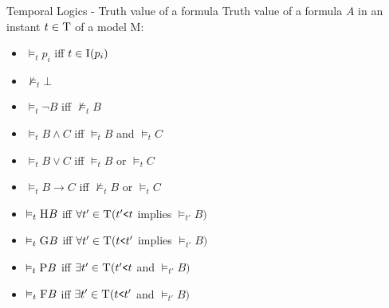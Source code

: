 \documentclass{beamer}
\begin{document}
\begin{frame}{Temporal Logics - Truth value of a formula}
    Truth value of a formula $A$ in an instant $t \in \textsc{T}$ of a model \textsc{M}:
    \begin{itemize}
        \item $\vDash_t p_i$ \hspace{2em} iff \hspace{2em} $t \in \textsc{I}(p_i)$
        \item $\nvDash_t \bot$
        \item $\vDash_t \neg B$ \hspace{3em} iff \hspace{2em} $\nvDash_t B$
        \item $\vDash_t B \land C$ \hspace{2em} iff \hspace{2em} $\vDash_t B$ and $\vDash_t C$
        \item $\vDash_t B \lor C$ \hspace{2.05em} iff \hspace{2em} $\vDash_t B$ or $\vDash_t C$
        \item $\vDash_t B \to C$ \hspace{1.6em} iff \hspace{2em} $\nvDash_t B$ or $\vDash_t C$
        \medskip
        \item $\vDash_t \textsc{H}B$ \hspace{2em} iff \hspace{2em} $\forall {t'} \in \textsc{T} ({t'} \texttt{<} t$ implies $\vDash_{t'} B)$
        \item $\vDash_t \textsc{G}B$ \hspace{2em} iff \hspace{2em} $\forall {t'} \in \textsc{T} (t \texttt{<} {t'}$ implies $\vDash_{t'} B)$
        \item $\vDash_t \textsc{P}B$ \hspace{2.14em} iff \hspace{2em} $\exists {t'} \in \textsc{T} ({t'} \texttt{<} t$ and $\vDash_{t'} B)$
        \item $\vDash_t \textsc{F}B$ \hspace{2.15em} iff \hspace{2em} $\exists {t'} \in \textsc{T} (t \texttt{<} {t'}$ and $\vDash_{t'} B)$
    \end{itemize}
\end{frame}
\end{document}
